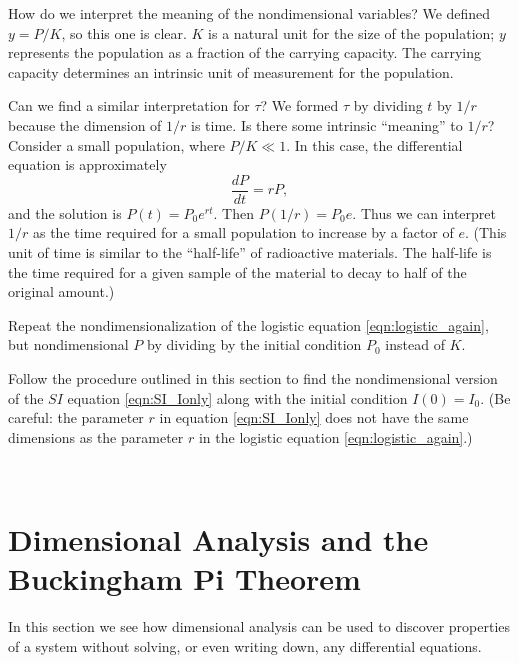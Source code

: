 How do we interpret the meaning of the nondimensional
variables?  We defined $y=P/K$, so this one is clear.
$K$ is a natural unit for the size of the population;
$y$ represents the population as a fraction of the
carrying capacity.
The carrying capacity determines an intrinsic
unit of measurement for the population.

Can we find a similar interpretation for $\tau$? We
formed $\tau$ by dividing $t$ by $1/r$ because
the dimension of $1/r$ is time. Is there some
intrinsic ``meaning'' to $1/r$?  Consider
a small population, where $P/K \ll 1$.  In this
case, the differential equation is approximately
\[
   \frac{dP}{dt} = rP,
\]
and the solution is $P(t) = P_0 e^{rt}$.
Then $P(1/r) = P_0 e$.
Thus we can interpret $1/r$ as the time required
for a small population to increase by
a factor of $e$.  (This unit of time is similar
to the ``half-life'' of radioactive materials.
The half-life is the time required for a given sample
of the material to decay to half of the original
amount.)

\newpage
%
\begin{exercises}
\begin{exercise}
Repeat the nondimensionalization of the logistic
equation \eqref{eqn:logistic_again}, but
nondimensional $P$ by dividing by the initial
condition $P_0$ instead of $K$.
\end{exercise}
\begin{exercise}
Follow the procedure outlined in this section
to find the nondimensional version of the
$SI$ equation \eqref{eqn:SI_Ionly} along
with the initial condition $I(0)=I_0$.
(Be careful: the parameter $r$ in equation
\eqref{eqn:SI_Ionly} does not have the same dimensions
as the parameter $r$ in the logistic equation
\eqref{eqn:logistic_again}.)
\end{exercise}
\end{exercises}

\newpage

~

\newpage

\section{Dimensional Analysis and the Buckingham Pi Theorem}

In this section we see how dimensional analysis can be
used to discover properties of a system
without solving, or even  writing down,
any differential equations.

